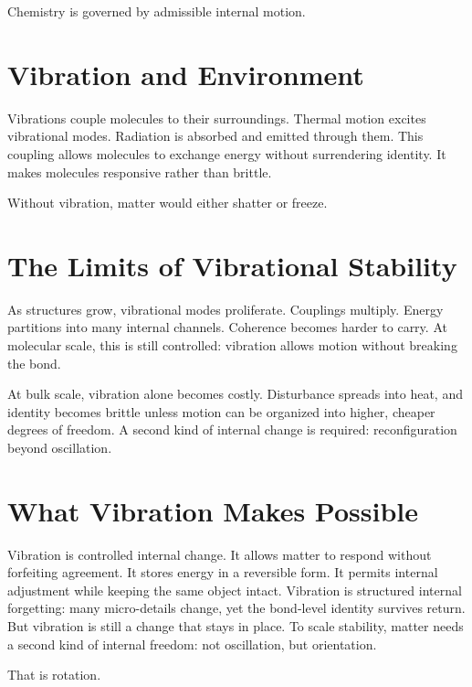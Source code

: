 \documentclass[11pt,twoside,openright]{book}
\begin{document}
Chemistry is governed by admissible internal motion.

\section*{Vibration and Environment}

Vibrations couple molecules to their surroundings. Thermal motion excites vibrational modes. Radiation is absorbed and emitted through them. This coupling allows molecules to exchange energy without surrendering identity. It makes molecules responsive rather than brittle.

Without vibration, matter would either shatter or freeze.

\section*{The Limits of Vibrational Stability}

As structures grow, vibrational modes proliferate. Couplings multiply. Energy partitions into many internal channels. Coherence becomes harder to carry. At molecular scale, this is still controlled: vibration allows motion without breaking the bond.

At bulk scale, vibration alone becomes costly. Disturbance spreads into heat, and identity becomes brittle unless motion can be organized into higher, cheaper degrees of freedom. A second kind of internal change is required: reconfiguration beyond oscillation.

\section*{What Vibration Makes Possible}

Vibration is controlled internal change. It allows matter to respond without forfeiting agreement. It stores energy in a reversible form. It permits internal adjustment while keeping the same object intact. Vibration is structured internal forgetting: many micro-details change, yet the bond-level identity survives return. But vibration is still a change that stays in place. To scale stability, matter needs a second kind of internal freedom: not oscillation, but orientation.

That is rotation.
\end{document}

